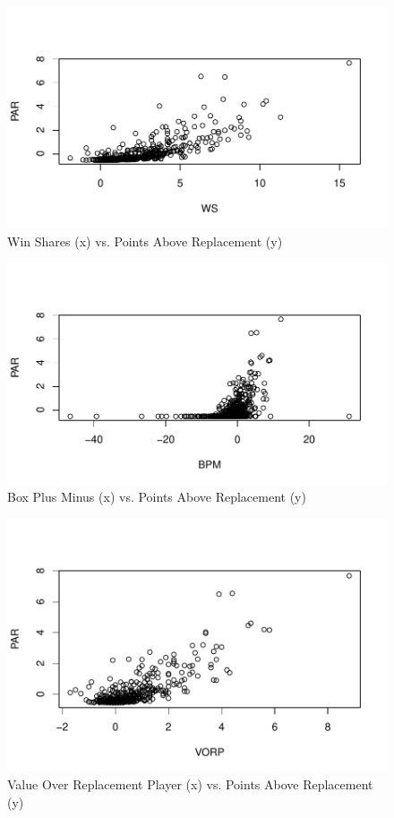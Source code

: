 \documentclass[titlepage, 12pt]{article}
\begin{document}
\begin{figure}[tbp]
  \centering
  \includegraphics[width=\textwidth]{WSvsPAR}
  \caption{Win Shares (x) vs. Points Above Replacement (y)}
  \label{fig:Fig2}
\end{figure}

\begin{figure}[tbp]
  \centering
  \includegraphics[width=\textwidth]{BPMvsPAR}
  \caption{Box Plus Minus (x) vs. Points Above Replacement (y)}
  \label{fig:Fig3}
\end{figure}

\begin{figure}[tbp]
  \centering
  \includegraphics[width=\textwidth]{VORPvsPAR}
  \caption{Value Over Replacement Player (x) vs. Points Above Replacement (y)}
  \label{fig:Fig4}
\end{figure}
\end{document}
